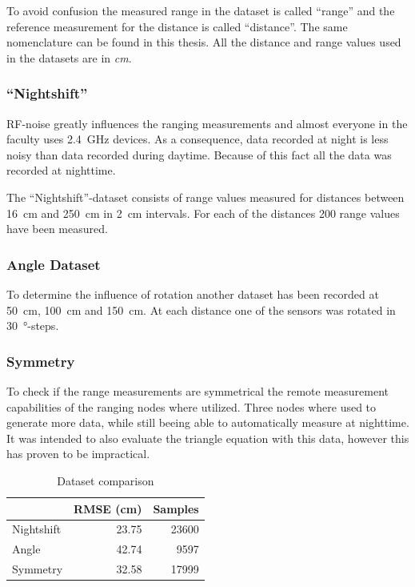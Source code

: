 To avoid confusion the measured range in the dataset is called \enquote{range} and the reference measurement for the distance is called \enquote{distance}.
The same nomenclature can be found in this thesis.
All the distance and range values used in the datasets are in \emph{cm}.

\subsubsection*{\enquote{Nightshift}}
RF-noise greatly influences the ranging measurements and almost everyone in the faculty uses \SI{2.4}{GHz} devices.
As a consequence, data recorded at night is less noisy than data recorded during daytime.
Because of this fact all the data was recorded at nighttime.

The \enquote{Nightshift}-dataset consists of range values measured for distances between \SI{16}{cm} and \SI{250}{cm} in \SI{2}{cm} intervals.
For each of the distances 200 range values have been measured.

\subsubsection*{Angle Dataset}
To determine the influence of rotation another dataset has been recorded at \SI{50}{cm}, \SI{100}{cm} and \SI{150}{cm}.
At each distance one of the sensors was rotated in \SI{30}{\degree}-steps.

\subsubsection*{Symmetry}
To check if the range measurements are symmetrical the remote measurement capabilities of the ranging nodes where utilized.
Three nodes where used to generate more data, while still beeing able to automatically measure at nighttime.
It was intended to also evaluate the triangle equation with this data, however this has proven to be impractical.

\begin{table}[h]
	\centering	
	\begin{tabular}{l | r | r}
	           & RMSE (cm) & Samples \\ \hline
	Nightshift & 23.75     & 23600   \\ 
	Angle      & 42.74     & 9597    \\
	Symmetry   & 32.58     & 17999   \\
	
	\end{tabular}

	\caption{Dataset comparison}
	\label{datasets}
	
\end{table}

